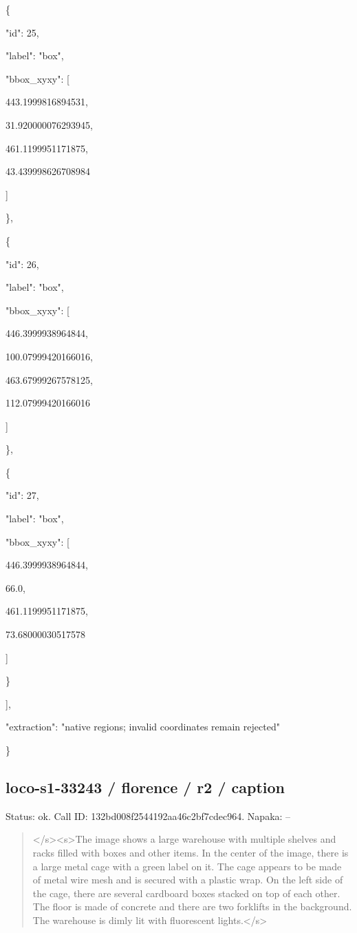 \documentclass[10pt,a4paper]{article}
\begin{document}
    \{\par
      "id":\allowbreak{} 25,\allowbreak{}\par
      "label":\allowbreak{} "box",\allowbreak{}\par
      "bbox\_xyxy":\allowbreak{} [\par
        443.1999816894531,\allowbreak{}\par
        31.920000076293945,\allowbreak{}\par
        461.1199951171875,\allowbreak{}\par
        43.439998626708984\par
      ]\par
    \},\allowbreak{}\par
    \{\par
      "id":\allowbreak{} 26,\allowbreak{}\par
      "label":\allowbreak{} "box",\allowbreak{}\par
      "bbox\_xyxy":\allowbreak{} [\par
        446.3999938964844,\allowbreak{}\par
        100.07999420166016,\allowbreak{}\par
        463.67999267578125,\allowbreak{}\par
        112.07999420166016\par
      ]\par
    \},\allowbreak{}\par
    \{\par
      "id":\allowbreak{} 27,\allowbreak{}\par
      "label":\allowbreak{} "box",\allowbreak{}\par
      "bbox\_xyxy":\allowbreak{} [\par
        446.3999938964844,\allowbreak{}\par
        66.0,\allowbreak{}\par
        461.1199951171875,\allowbreak{}\par
        73.68000030517578\par
      ]\par
    \}\par
  ],\allowbreak{}\par
  "extraction":\allowbreak{} "native regions; invalid coordinates remain rejected"\par
\}
\subsection*{loco-s1-33243 / florence / r2 / caption}
Status: ok. Call ID: 132bd008f2544192aa46c2bf7cdec964. Napaka: --
\begin{quote}\footnotesize
</s>\allowbreak{}<s>\allowbreak{}The image shows a large warehouse with multiple shelves and racks filled with boxes and other items. In the center of the image,\allowbreak{} there is a large metal cage with a green label on it. The cage appears to be made of metal wire mesh and is secured with a plastic wrap. On the left side of the cage,\allowbreak{} there are several cardboard boxes stacked on top of each other. The floor is made of concrete and there are two forklifts in the background. The warehouse is dimly lit with fluorescent lights.</s>\allowbreak{}
\end{quote}
\end{document}
